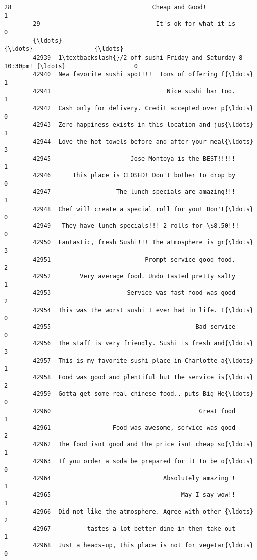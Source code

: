 \documentclass[11pt]{article}
\begin{document}
\begin{Verbatim}[commandchars=\\\{\}]
        28                                       Cheap and Good!                   1   
        29                                It's ok for what it is                   0   
        {\ldots}                                                  {\ldots}                 {\ldots}   
        42939  1\textbackslash{}/2 off sushi Friday and Saturday 8-10:30pm! {\ldots}                   0   
        42940  New favorite sushi spot!!!  Tons of offering f{\ldots}                   1   
        42941                                Nice sushi bar too.                   1   
        42942  Cash only for delivery. Credit accepted over p{\ldots}                   0   
        42943  Zero happiness exists in this location and jus{\ldots}                   1   
        42944  Love the hot towels before and after your meal{\ldots}                   3   
        42945                      Jose Montoya is the BEST!!!!!                   1   
        42946      This place is CLOSED! Don't bother to drop by                   0   
        42947                  The lunch specials are amazing!!!                   1   
        42948  Chef will create a special roll for you! Don't{\ldots}                   0   
        42949   They have lunch specials!!! 2 rolls for \$8.50!!!                   0   
        42950  Fantastic, fresh Sushi!!! The atmosphere is gr{\ldots}                   3   
        42951                          Prompt service good food.                   2   
        42952        Very average food. Undo tasted pretty salty                   1   
        42953                     Service was fast food was good                   2   
        42954  This was the worst sushi I ever had in life. I{\ldots}                   0   
        42955                                        Bad service                   0   
        42956  The staff is very friendly. Sushi is fresh and{\ldots}                   3   
        42957  This is my favorite sushi place in Charlotte a{\ldots}                   1   
        42958  Food was good and plentiful but the service is{\ldots}                   2   
        42959  Gotta get some real chinese food.. puts Big He{\ldots}                   0   
        42960                                         Great food                   1   
        42961                 Food was awesome, service was good                   2   
        42962  The food isnt good and the price isnt cheap so{\ldots}                   1   
        42963  If you order a soda be prepared for it to be o{\ldots}                   0   
        42964                               Absolutely amazing !                   1   
        42965                                    May I say wow!!                   1   
        42966  Did not like the atmosphere. Agree with other {\ldots}                   2   
        42967          tastes a lot better dine-in then take-out                   1   
        42968  Just a heads-up, this place is not for vegetar{\ldots}                   0   
        

\end{Verbatim}
\end{document}
